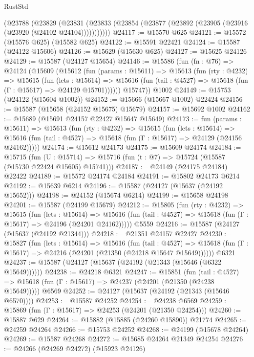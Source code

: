 \begin{lexlean}{RustStd}
\begin{coremodule}
    (@23788
      (@23829
        (@23831 (@23833 (@23854 (@23877 (@23892 (@23905 (@23916 (@23920 (@24102 @24104)))))))))))
@24117 := @15570 @625
@24121 := @15572 (@15576 @625) (@15582 @625)
@24122 := @15591 @22421
@24124 := @15587 (@24122 @15606)
@24126 := @15629 (@15630 @625)
@24127 := @15625 @24126
@24129 := @15587 (@24127 @15654)
@24146 := @15586
    (fun (fn : @76) =>
    @24124
      (@15609
        (@15612
          (fun (params : @15611) =>
          @15613
            (fun (rty : @4232) =>
            @15615
              (fun (lets : @15614) =>
              @15616 (fun (tail : @4527) => @15618 (fun (Γ : @15617) => @24129 @15701))))))
        @15747))
    @1002
@24149 := @15753 (@24122 (@15604 @1002))
@24152 := @15666 (@15667 @1002) @22424
@24156 := @15587 (@15658 (@24152 @15675) @15679)
@24157 := @15692 @1002
@24162 := @15689 (@15691 @24157 @22427 @15647 @15649)
@24173 := fun (params : @15611) =>
  @15613
    (fun (rty : @4232) =>
    @15615
      (fun (lets : @15614) =>
      @15616 (fun (tail : @4527) => @15618 (fun (Γ : @15617) => @24129 (@24156 @24162)))))
@24174 := @15612 @24173
@24175 := @15609 @24174
@24184 := @15715
    (fun (U : @15714) => @15716 (fun (t : @7) => @15724 (@15587 (@15730 @22424 @15605) @15741)))
@24187 := @24149 (@24175 @24184) @22422
@24189 := @15572 @24174 @24184
@24191 := @15802 @24173 @6214
@24192 := @15639 @6214
@24196 := @15587 (@24127 (@15637 (@24192 @15652)))
@24198 := @24152 (@15674 @6214)
@24199 := @15658 @24198
@24201 := @15587 (@24199 @15679)
@24212 := @15805
    (fun (rty : @4232) =>
    @15615
      (fun (lets : @15614) =>
      @15616 (fun (tail : @4527) => @15618 (fun (Γ : @15617) => @24196 (@24201 @24162)))))
    @5559
@24216 := @15587 (@24127 (@15637 (@24192 @21344)))
@24218 := @21351 @24157 @22427
@24230 := @15827
    (fun (lets : @15614) =>
    @15616
      (fun (tail : @4527) =>
      @15618 (fun (Γ : @15617) => @24216 (@24201 (@21350 (@24218 @15647 @15649))))))
    @6321
@24237 := @15587 (@24127 (@15637 (@24192 (@21343 (@15646 (@6322 @15649))))))
@24238 := @24218 @6321
@24247 := @15851
    (fun (tail : @4527) => @15618 (fun (Γ : @15617) => @24237 (@24201 (@21350 (@24238 @15649)))))
    @6569
@24252 := @24127 (@15637 (@24192 (@21343 (@15646 @6570))))
@24253 := @15587 @24252
@24254 := @24238 @6569
@24259 := @15869 (fun (Γ : @15617) => @24253 (@24201 (@21350 @24254)))
@24260 := @15887 @629
@24264 := @15882 (@15885 (@24260 @15890)) @21774
@24265 := @24259 @24264
@24266 := @15753 @24252
@24268 := @24199 (@15678 @24264)
@24269 := @15587 @24268
@24272 := @15685 @24264 @21349 @24254
@24276 := @24266 (@24269 @24272) (@15923 @24126)

\end{coremodule}
\end{lexlean}
